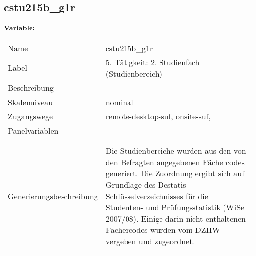 	
	
	\subsection{cstu215b\_g1r}
	\label{subSection:cstu215b_g1r}

	\noindent\textbf{Variable:}\\
		\begin{tabular}{lL{11.3cm}}
			\label{tableVariable:cstu215b_g1r}
			Name & cstu215b\_g1r \\
			Label & 5. Tätigkeit: 2. Studienfach (Studienbereich) \\
			Beschreibung & - \\
			Skalenniveau & nominal \\
			Zugangswege &
				remote-desktop-suf,
				onsite-suf,
 \\
			Panelvariablen & -
			 \\
			 \\
 \\
					Generierungsbeschreibung & Die Studienbereiche wurden aus den von den Befragten angegebenen Fächercodes generiert. Die Zuordnung ergibt sich auf Grundlage des Destatis-Schlüsselverzeichnisses für die Studenten- und Prüfungsstatistik (WiSe 2007/08). Einige darin nicht enthaltenen Fächercodes wurden vom DZHW vergeben und zugeordnet. 
				 \\	
			 \\
		\end{tabular}






